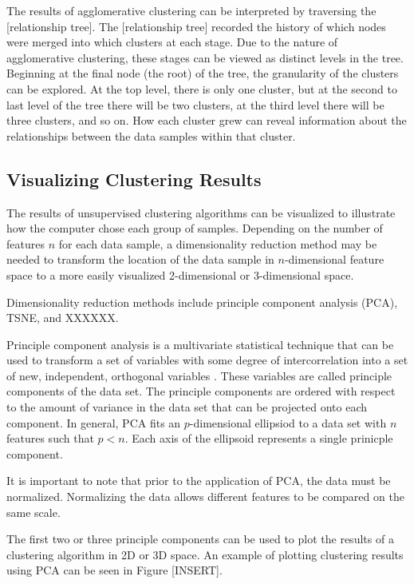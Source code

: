 The results of agglomerative clustering can be interpreted by traversing the [relationship tree]. The [relationship tree] recorded the history of which nodes were merged into which clusters at each stage. Due to the nature of agglomerative clustering, these stages can be viewed as distinct levels in the tree. Beginning at the final node (the root) of the tree, the granularity of the clusters can be explored. At the top level, there is only one cluster, but at the second to last level of the tree there will be two clusters, at the third level there will be three clusters, and so on. How each cluster grew can reveal information about the relationships between the data samples within that cluster.

\subsection{Visualizing Clustering Results} 

The results of unsupervised clustering algorithms can be visualized to illustrate how the computer chose each group of samples. Depending on the number of features $n$ for each data sample, a dimensionality reduction method may be needed to transform the location of the data sample in $n$-dimensional feature space to a more easily visualized 2-dimensional or 3-dimensional space.

Dimensionality reduction methods include principle component analysis (PCA), TSNE, and XXXXXX.

Principle component analysis is a multivariate statistical technique that can be used to transform a set of variables with some degree of intercorrelation into a set of new, independent, orthogonal variables \cite{Abdi2010}. These variables are called principle components of the data set. The principle components are ordered with respect to the amount of variance in the data set that can be projected onto each component. In general, PCA fits an $p$-dimensional ellipsiod to a data set with $n$ features such that $p < n$. Each axis of the ellipsoid represents a single prinicple component. 

It is important to note that prior to the application of PCA, the data must be normalized. Normalizing the data allows different features to be compared on the same scale.

The first two or three principle components can be used to plot the results of a clustering algorithm in 2D or 3D space. An example of plotting clustering results using PCA can be seen in Figure [INSERT].

